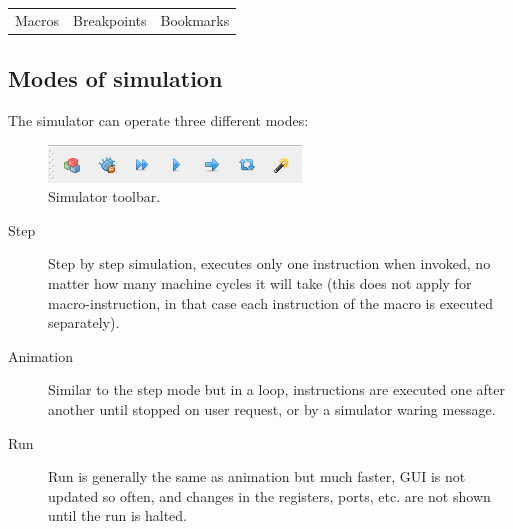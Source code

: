 \begin{table}[h!]
\begin{tabular}{ccc}
                \\ Macros & Breakpoints & Bookmarks
            \end{tabular}
        \end{table}


    \subsection{Modes of simulation}
        The simulator can operate three different modes:

        \begin{figure}[h!]
            \centering{}
            \includegraphics[width=.4\textwidth]{img/simulation_panel.png}
            \caption{Simulator toolbar.}
        \end{figure}

        \begin{description}
            \item [Step]
                Step by step simulation, executes only one instruction when invoked, no matter how many machine cycles
                it will take (this does not apply for macro-instruction, in that case each instruction of the macro is
                executed separately).
            \item [Animation]
                Similar to the step mode but in a loop, instructions are executed one after another until stopped on
                user request, or by a simulator waring message.
            \item [Run]
                Run is generally the same as animation but much faster, GUI is not updated so often, and changes in the
                registers, ports, etc. are not shown until the run is halted.
        \end{description}
